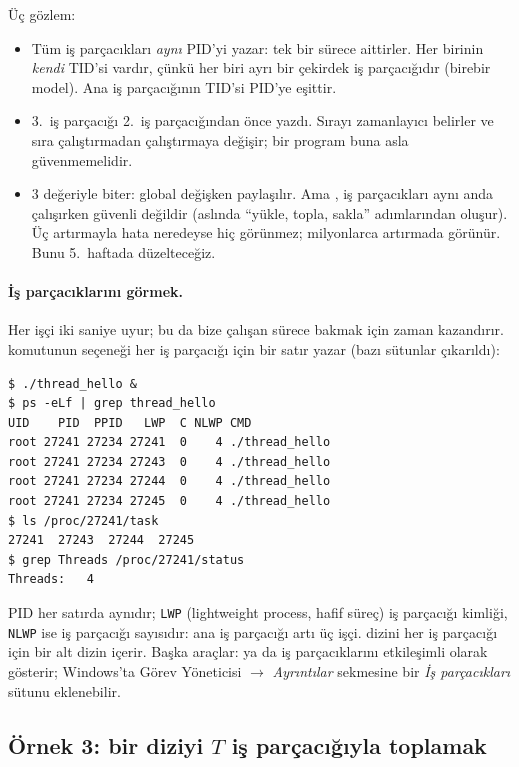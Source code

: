 Üç gözlem:
\begin{itemize}
  \item Tüm iş parçacıkları \emph{aynı} PID'yi yazar: tek bir sürece aittirler. Her birinin \emph{kendi} TID'si vardır, çünkü her biri ayrı bir çekirdek iş parçacığıdır (birebir model). Ana iş parçacığının TID'si PID'ye eşittir.
  \item 3.~iş parçacığı 2.~iş parçacığından önce yazdı. Sırayı zamanlayıcı belirler ve sıra çalıştırmadan çalıştırmaya değişir; bir program buna asla güvenmemelidir.
  \item {} $3$ değeriyle biter: global değişken paylaşılır. Ama , iş parçacıkları aynı anda çalışırken güvenli değildir (aslında ``yükle, topla, sakla'' adımlarından oluşur). Üç artırmayla hata neredeyse hiç görünmez; milyonlarca artırmada görünür. Bunu 5.~haftada düzelteceğiz.
\end{itemize}

\paragraph{İş parçacıklarını görmek.} Her işçi iki saniye uyur; bu da bize çalışan sürece bakmak için zaman kazandırır.  komutunun  seçeneği her iş parçacığı için bir satır yazar (bazı sütunlar çıkarıldı):

\begin{lstlisting}[style=term]
$ ./thread_hello &
$ ps -eLf | grep thread_hello
UID    PID  PPID   LWP  C NLWP CMD
root 27241 27234 27241  0    4 ./thread_hello
root 27241 27234 27243  0    4 ./thread_hello
root 27241 27234 27244  0    4 ./thread_hello
root 27241 27234 27245  0    4 ./thread_hello
$ ls /proc/27241/task
27241  27243  27244  27245
$ grep Threads /proc/27241/status
Threads:   4
\end{lstlisting}

PID her satırda aynıdır; \texttt{LWP} (lightweight process, hafif süreç) iş parçacığı kimliği, \texttt{NLWP} ise iş parçacığı sayısıdır: ana iş parçacığı artı üç işçi.  dizini her iş parçacığı için bir alt dizin içerir. Başka araçlar:  ya da  iş parçacıklarını etkileşimli olarak gösterir; Windows'ta Görev Yöneticisi $\to$ \emph{Ayrıntılar} sekmesine bir \emph{İş parçacıkları} sütunu eklenebilir.

\subsection{Örnek 3: bir diziyi $T$ iş parçacığıyla toplamak}
\label{sec:arraysum}

